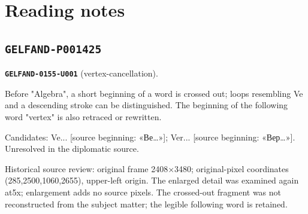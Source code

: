 \section*{Reading notes}
\subsection*{\texttt{GELFAND-P001425}}
\par\noindent\leavevmode{}\label{GELFAND-0155-U001}\label{GELFAND-P001425:vertex-cancellation}\textbf{\texttt{GELFAND-0155-U001}} (vertex-cancellation).\nopagebreak[4]\par
Before "Algebra", a short beginning of a word is crossed out; loops resembling Ve and a descending stroke can be distinguished. The beginning of the following word "vertex" is also retraced or rewritten.\par
Candidates: Ve... [source beginning: «Ве…»]; Ver... [source beginning: «Вер…»]. Unresolved in the diplomatic source.\par
Historical source review: original frame 2408×3480; original-pixel coordinates (285,2500,1060,2655), upper-left origin. The enlarged detail was examined again at5x; enlargement adds no source pixels. The crossed-out fragment was not reconstructed from the subject matter; the legible following word is retained.\par
\medskip
